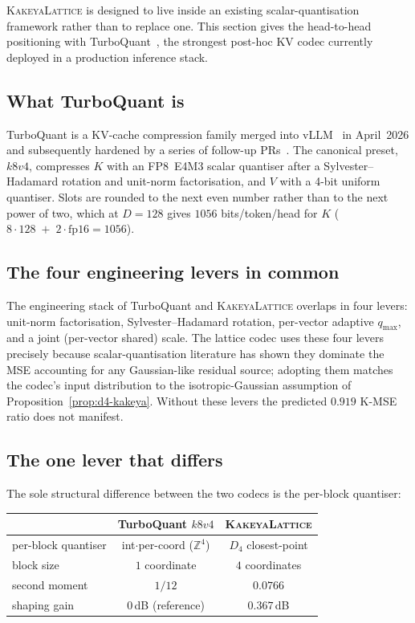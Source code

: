 \documentclass[11pt,a4paper]{article}
\theoremstyle{definition}
\theoremstyle{plain}
\newcommand{\Z}{\mathbb{Z}}
\begin{document}
\textsc{KakeyaLattice} is designed to live inside an existing
scalar-quantisation framework rather than to replace one. This
section gives the head-to-head positioning with
TurboQuant~\cite{turboquant-vllm,vllm-pr-38479}, the strongest
post-hoc KV codec currently deployed in a production inference
stack.

\subsection{What TurboQuant is}

TurboQuant is a KV-cache compression family merged into
vLLM~\cite{vllm-pr-38479} in April~2026 and subsequently hardened by
a series of follow-up
PRs~\cite{vllm-pr-40194,vllm-pr-39953,vllm-pr-40060,vllm-pr-40122}.
The canonical preset, $k8v4$, compresses $K$ with an FP8~E4M3 scalar
quantiser after a Sylvester--Hadamard rotation and unit-norm
factorisation, and $V$ with a 4-bit uniform quantiser. Slots are
rounded to the next even number rather than to the next power of two,
which at $D=128$ gives $1056$ bits/token/head for $K$ ($8\cdot 128
\;+\; 2\cdot\mathrm{fp16} = 1056$).

\subsection{The four engineering levers in common}

The engineering stack of TurboQuant and \textsc{KakeyaLattice}
overlaps in four levers: unit-norm factorisation,
Sylvester--Hadamard rotation, per-vector adaptive $q_\mathrm{max}$,
and a joint (per-vector shared) scale. The lattice codec uses these
four levers precisely because scalar-quantisation literature has
shown they dominate the MSE accounting for any Gaussian-like
residual source; adopting them matches the codec's input
distribution to the isotropic-Gaussian assumption of
Proposition~\ref{prop:d4-kakeya}. Without these levers the predicted
$0.919$ K-MSE ratio does not manifest.

\subsection{The one lever that differs}

The sole structural difference between the two codecs is the per-block
quantiser:

\begin{center}
\begin{tabular}{lcc}
  \toprule
                  & TurboQuant $k8v4$            & \textsc{KakeyaLattice} \\
  \midrule
  per-block quantiser & int$\cdot$per-coord ($\Z^4$) & $D_4$ closest-point \\
  block size          & $1$ coordinate            & $4$ coordinates   \\
  second moment       & $1/12$                    & $0.0766$          \\
  shaping gain        & $0\,$dB (reference)       & $0.367\,$dB       \\
  \bottomrule
\end{tabular}
\end{center}
\end{document}
